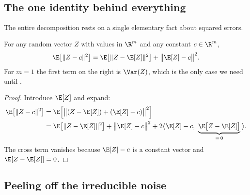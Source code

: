 \subsection{The one identity behind everything}

The entire decomposition rests on a single elementary fact about squared errors.

\begin{lemma}
\label{lem:bv-identity}
For any random vector $Z$ with values in $\R^m$ and any constant $c \in \R^m$,
\[
\E\big[ \Vert Z - c \Vert^2 \big] = \E\big[ \Vert Z - \E[Z] \Vert^2 \big]
+ \big\Vert \E[Z] - c \big\Vert^2 .
\]
For $m = 1$ the first term on the right is $\Var(Z)$, which is the only case we need
until .
\end{lemma}

\begin{proof}
Introduce $\E[Z]$ and expand:
\begin{align*}
\E\big[\Vert Z - c \Vert^2\big]
&= \E\Big[ \big\Vert (Z - \E[Z]) + (\E[Z] - c) \big\Vert^2 \Big] \\
&= \E\big[\Vert Z - \E[Z] \Vert^2\big]
 + \big\Vert \E[Z] - c \big\Vert^2
 + 2 \big\langle \E[Z] - c,\ \underbrace{\E\big[Z - \E[Z]\big]}_{= \, 0} \big\rangle .
\end{align*}
The cross term vanishes because $\E[Z] - c$ is a constant vector and
$\E[Z - \E[Z]] = 0$.
\end{proof}

\subsection{Peeling off the irreducible noise}

